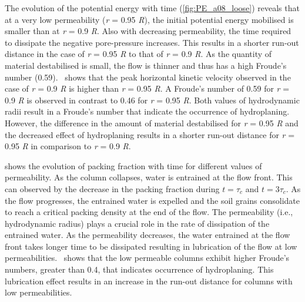 \documentclass[12pt,a4paper,twocolumn,fleqn]{narms}
\begin{document}
The evolution of the potential energy with time (\cref{fig:PE_a08_loose}) 
reveals that at a very low permeability (\textit{r} = 0.95 \textit{R}), the 
initial potential energy mobilised is smaller than at \textit{r} = 0.9 
\textit{R}. Also with decreasing permeability, the time required to 
dissipate the negative pore-pressure increases. This results in a shorter 
run-out distance in the case of \textit{r} = 0.95 \textit{R} to that of 
\textit{r} = 0.9 \textit{R}. As the quantity of material destabilised is small, 
the flow is thinner and thus has a high Froude's number 
(0.59).~ shows that the peak horizontal kinetic 
velocity observed in the case of \textit{r} = 0.9 \textit{R} is higher than 
\textit{r} = 0.95 \textit{R}. A Froude's number of 0.59 for \textit{r} = 0.9 
\textit{R} is observed in contrast to 0.46 for \textit{r} = 0.95 \textit{R}. 
Both values of hydrodynamic radii result in a Froude's number that indicate the 
occurrence of hydroplaning. However, the difference in the amount of material 
destabilised for \textit{r} = 0.95 \textit{R} and the decreased effect of 
hydroplaning results in a shorter run-out distance for \textit{r} = 0.95 
\textit{R} in comparison to \textit{r} = 0.9 \textit{R}.


 shows the evolution of packing 
fraction with time for different values of permeability. As the column 
collapses, water is entrained at the flow front. This can 
observed by the decrease in the packing fraction during $t = \tau_c$ and $t = 
3\tau_c$. As the flow progresses, the entrained water is expelled and the soil 
grains consolidate to reach a critical packing density at the end of the flow. 
The permeability (i.e., hydrodynamic radius) plays a crucial role in the rate 
of dissipation of the entrained water. As the permeability decreases, the water 
entrained at the flow front takes longer time to be dissipated resulting in 
lubrication of the flow at low permeabilities.~ shows 
that the low permeable columns exhibit higher Froude's numbers, greater than 
0.4, that indicates occurrence of hydroplaning. This lubrication effect results 
in an increase in the run-out distance for columns with low permeabilities.
\end{document}
